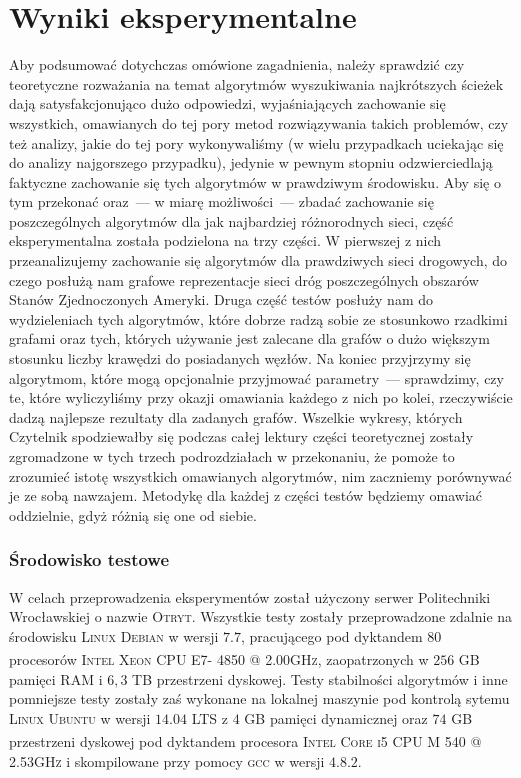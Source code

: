 \chapter{Wyniki eksperymentalne}

Aby podsumować dotychczas omówione zagadnienia, należy sprawdzić czy teoretyczne rozważania na temat algorytmów wyszukiwania najkrótszych ścieżek dają satysfakcjonująco dużo odpowiedzi, wyjaśniających zachowanie się wszystkich, omawianych do tej pory metod rozwiązywania takich problemów, czy też analizy, jakie do tej pory wykonywaliśmy (w wielu przypadkach uciekając się do analizy najgorszego przypadku), jedynie w pewnym stopniu odzwierciedlają faktyczne zachowanie się tych algorytmów w prawdziwym środowisku. Aby się o tym przekonać oraz~--- w miarę możliwości~--- zbadać zachowanie się poszczególnych algorytmów dla jak najbardziej różnorodnych sieci, część eksperymentalna została podzielona na trzy części. W pierwszej z nich przeanalizujemy zachowanie się algorytmów dla prawdziwych sieci drogowych, do czego posłużą nam grafowe reprezentacje sieci dróg poszczególnych obszarów Stanów Zjednoczonych Ameryki. Druga część testów posłuży nam do wydzieleniach tych algorytmów, które dobrze radzą sobie ze stosunkowo rzadkimi grafami oraz tych, których używanie jest zalecane dla grafów o dużo większym stosunku liczby krawędzi do posiadanych węzłów. Na koniec przyjrzymy się algorytmom, które mogą opcjonalnie przyjmować parametry~--- sprawdzimy, czy te, które wyliczyliśmy przy okazji omawiania każdego z nich po kolei, rzeczywiście dadzą najlepsze rezultaty dla zadanych grafów. Wszelkie wykresy, których Czytelnik spodziewałby się podczas całej lektury części teoretycznej zostały zgromadzone w tych trzech podrozdziałach w przekonaniu, że pomoże to zrozumieć istotę wszystkich omawianych algorytmów, nim zaczniemy porównywać je ze sobą nawzajem. Metodykę dla każdej z części testów będziemy omawiać oddzielnie, gdyż różnią się one od siebie.

\subsection{Środowisko testowe}

W celach przeprowadzenia eksperymentów został użyczony serwer Politechniki Wrocławskiej o nazwie \textsc{Otryt}. Wszystkie testy zostały przeprowadzone zdalnie na środowisku \textsc{Linux Debian} w wersji $7.7$, pracującego pod dyktandem $80$ procesorów \textsc{Intel\textsuperscript{\textregistered} Xeon\textsuperscript{\textregistered} CPU E7- 4850  @ 2.00GHz}, zaopatrzonych w $256$ \textsc{GB} pamięci \textsc{RAM} i $6,3$ \textsc{TB} przestrzeni dyskowej. Testy stabilności algorytmów i inne pomniejsze testy zostały zaś wykonane na lokalnej maszynie pod kontrolą sytemu \textsc{Linux Ubuntu} w wersji $14.04$ \textsc{LTS} z $4$ \textsc{GB} pamięci dynamicznej oraz $74$ \textsc{GB} przestrzeni dyskowej pod dyktandem procesora \textsc{Intel\textsuperscript{\textregistered} Core\textsuperscript{\texttrademark} i5 CPU M 540  @ 2.53GHz} i skompilowane przy pomocy \textsc{gcc} w wersji $4.8.2$.

